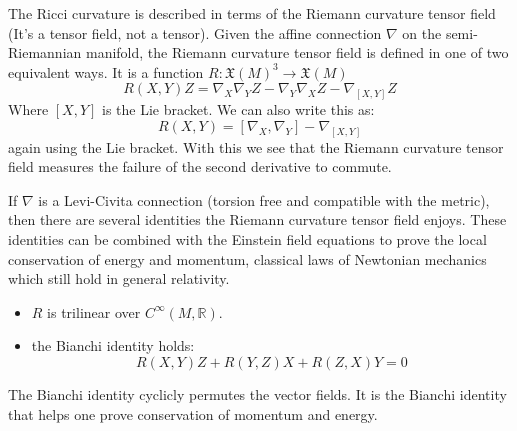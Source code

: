 \documentclass{beamer}
\begin{document}
    \begin{frame}
        The Ricci curvature is described in terms of the Riemann curvature
        tensor field (It's a tensor field, not a tensor). Given the affine
        connection $\nabla$ on the semi-Riemannian manifold, the Riemann
        curvature tensor field is defined in one of two equivalent ways.
        It is a function $R:\mathfrak{X}(M)^{3}\rightarrow\mathfrak{X}(M)$
        \begin{equation}
            R(X,Y)Z=
                \nabla_{X}\nabla_{Y}Z-\nabla_{Y}\nabla_{X}Z-\nabla_{[X,Y]}Z
        \end{equation}
        Where $[X,Y]$ is the Lie bracket. We can also write this as:
        \begin{equation}
            R(X,Y)=[\nabla_{X},\nabla_{Y}]-\nabla_{[X,Y]}
        \end{equation}
        again using the Lie bracket. With this we see that the Riemann
        curvature tensor field measures the failure of the second derivative to
        commute.
    \end{frame}
    \begin{frame}
        If $\nabla$ is a Levi-Civita connection (torsion free and compatible
        with the metric), then there are several identities the Riemann
        curvature tensor field enjoys. These identities can be combined with
        the Einstein field equations to prove the local conservation of
        energy and momentum, classical laws of Newtonian mechanics which still
        hold in general relativity.
        \begin{itemize}
            \item $R$ is trilinear over $C^{\infty}(M,\mathbb{R})$.
            \item the Bianchi identity holds:
                \begin{equation}
                    R(X,Y)Z+R(Y,Z)X+R(Z,X)Y=0
                \end{equation}
        \end{itemize}
        The Bianchi identity cyclicly permutes the vector fields. It is the
        Bianchi identity that helps one prove conservation of momentum and
        energy.
    \end{frame}
\end{document}
